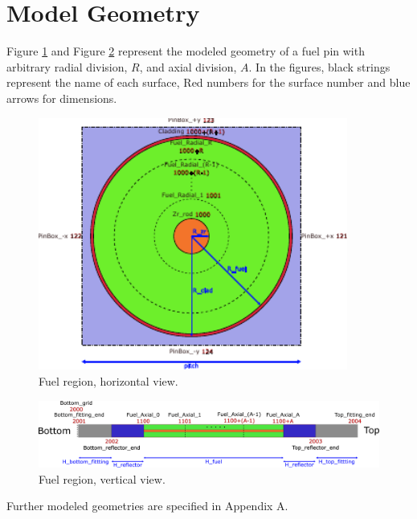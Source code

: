 \documentclass{UWNR_modeling}
\begin{document}
\section{Model Geometry}\label{section:geometry}
Figure \ref{fig:fuel_xy} and Figure \ref{fig:fuel_yz} represent the modeled geometry of a fuel pin with arbitrary radial division, $R$, and axial division, $A$. In the figures, black strings represent the name of each surface, Red numbers for the surface number and blue arrows for dimensions.

\begin{figure}[H]
  \centering
  \includegraphics[width=4in]{fuel_xy.pdf}
  \caption{Fuel region, horizontal view.}
  \label{fig:fuel_xy}
\end{figure}

\begin{figure}[H]
  \centering
  \includegraphics[width=7in]{fuel_yz.pdf}
  \caption{Fuel region, vertical view.}
  \label{fig:fuel_yz}
\end{figure}

Further modeled geometries are specified in Appendix A.
\newpage
\end{document}
